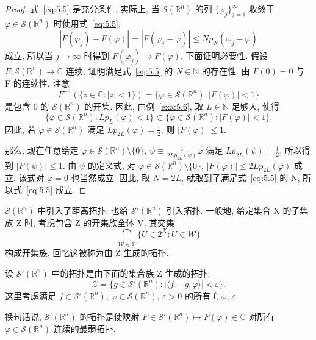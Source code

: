\begin{proof}
式~\eqref{eq:5.5} 是充分条件. 实际上, 当 $\mathcal{S}(\mathbb{R}^{n})$ 的列 $\{\varphi_{j}\}_{j=1}^{\infty}$ 收敛于 $\varphi \in \mathcal{S}(\mathbb{R}^{n})$ 时使用式~\eqref{eq:5.5},
\[
|F(\varphi_{j}) - F(\varphi)| = |F(\varphi_{j} - \varphi)| \leq Np_{N}(\varphi_{j} - \varphi)
\]
成立, 所以当 $j \to \infty$ 时得到 $F(\varphi_{j}) \to F(\varphi)$. 下面证明必要性. 假设 $F: \mathcal{S}(\mathbb{R}^{n}) \to \mathbb{C}$ 连续, 证明满足式~\eqref{eq:5.5} 的 $N \in \mathbb{N}$ 的存在性. 由 $F(0) = 0$ 与 F 的连续性, 注意
\begin{equation}\tag{5.6}
F^{-1}(\{z \in \mathbb{C} : |z| < 1\}) = \{\varphi \in \mathcal{S}(\mathbb{R}^{n}) : |F(\varphi)| < 1\}
\label{eq:5.6}
\end{equation}
是包含 0 的 $\mathcal{S}(\mathbb{R}^{n})$ 的开集. 因此, 由例~\ref{exa:5.6}, 取 $L \in \mathbb{N}$ 足够大, 使得
\[
\{\varphi \in \mathcal{S}(\mathbb{R}^{n}) : Lp_{L}(\varphi) < 1\} \subset \{\varphi \in \mathcal{S}(\mathbb{R}^{n}) : |F(\varphi)| < 1\}.
\]
因此, 若 $\varphi \in \mathcal{S}(\mathbb{R}^{n})$ 满足 $Lp_{2L}(\varphi) = \frac{1}{2}$, 则 $|F(\varphi)| \leq 1$.

那么, 现在任意给定 $\varphi \in \mathcal{S}(\mathbb{R}^{n}) \setminus \{0\}$, $\psi \equiv \frac{1}{2Lp_{2L}(\varphi)}\varphi$ 满足 $Lp_{2L}(\psi) = \frac{1}{2}$, 所以得到 $|F(\psi)| \leq 1$. 由 $\psi$ 的定义式, 对 $\varphi \in \mathcal{S}(\mathbb{R}^{n}) \setminus \{0\}$, $|F(\varphi)| \leq 2Lp_{2L}(\varphi)$ 成立. 该式对 $\varphi = 0$ 也当然成立. 因此, 取 $N = 2L$, 就取到了满足式~\eqref{eq:5.5} 的 N, 所以式~\eqref{eq:5.5} 成立.
\end{proof}

$\mathcal{S}(\mathbb{R}^{n})$ 中引入了距离拓扑, 也给 $\mathcal{S}'(\mathbb{R}^{n})$ 引入拓扑. 一般地, 给定集合 X 的子集族 Z 时, 考虑包含 Z 的开集族全体 V, 其交集
\[
\bigcap_{\mathcal{W} \in \mathcal{V}}\{U \in 2^{X} : U \in \mathcal{W}\}
\]
构成开集族, 回忆这被称为由 Z 生成的拓扑.

\begin{definition}\label{def:5.3}
设 $\mathcal{S}'(\mathbb{R}^{n})$ 中的拓扑是由下面的集合族 Z 生成的拓扑:
\[
\mathcal{Z} = \{g \in \mathcal{S}'(\mathbb{R}^{n}) : |\langle f - g, \varphi\rangle| < \varepsilon\}.
\]
这里考虑满足 $f \in \mathcal{S}'(\mathbb{R}^{n})$, $\varphi \in \mathcal{S}(\mathbb{R}^{n})$, $\varepsilon > 0$ 的所有 f, $\varphi$, $\varepsilon$.
\end{definition}

换句话说, $\mathcal{S}'(\mathbb{R}^{n})$ 的拓扑是使映射 $F \in \mathcal{S}'(\mathbb{R}^{n}) \mapsto F(\varphi) \in \mathbb{C}$ 对所有 $\varphi \in \mathcal{S}(\mathbb{R}^{n})$ 连续的最弱拓扑.

